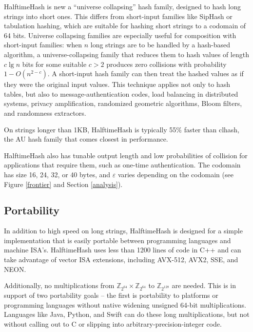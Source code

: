 \documentclass[runningheads]{llncs}
\newcommand{\ints}{\mathbb{Z}}
\begin{document}
HalftimeHash is new a ``universe collapsing'' hash family, designed to hash long strings into short ones. \cite{linear-hash-functions,hashing-without-primes-revisited,cuckoo-journal}
This differs from short-input families like SipHash or tabulation hashing, which are suitable for hashing short strings to a codomain of 64 bits. \cite{siphash,tabulation}
Universe collapsing families are especially useful for composition with short-input families: when $n$ long strings are to be handled by a hash-based algorithm, a universe-collapsing family that reduces them to hash values of length $c \lg n$ bits for some suitable $c > 2$ produces zero collisions with probability $1-O(n^{2-c})$.
A short-input hash family can then treat the hashed values as if they were the original input values. \cite{universe-collapse-linear-probing,siphash,tabulation,simple-hash-functions-work}
This technique applies not only to hash tables, but also to message-authentication codes, load balancing in distributed systems, privacy amplification, randomized geometric algorithms, Bloom filters, and randomness extractors. \cite{poly1305,chord,privacy-amplification,random-closest-pair,simple-hash-functions-work,fuzzy-extractors}

On strings longer than 1KB, HalftimeHash is typically 55\% faster than clhash, the AU hash family that comes closest in performance.

HalftimeHash also has tunable output length and low probabilities of collision for applications that require them, such as one-time authentication. \cite{nacl}
The codomain has size 16, 24, 32, or 40 bytes, and $\varepsilon$ varies depending on the codomain (see Figure \ref{frontier} and Section \ref{analysis}).

\subsection{Portability}

In addition to high speed on long strings, HalftimeHash is designed for a simple implementation that is easily portable between programming languages and machine ISA's.
HalftimeHash uses less than 1200 lines of code in C++ and can take advantage of vector ISA extensions, including AVX-512, AVX2, SSE, and NEON.

Additionally, no multiplications from $\ints_{2^{64}} \times \ints_{2^{64}}$ to $\ints_{2^{128}}$ are needed.
This is in support of two portability goals -- the first is portability to platforms or programming languages without native widening unsigned 64-bit multiplications.
Languages like Java, Python, and Swift can do these long multiplications, but not without calling out to C or slipping into arbitrary-precision-integer code.
\end{document}
